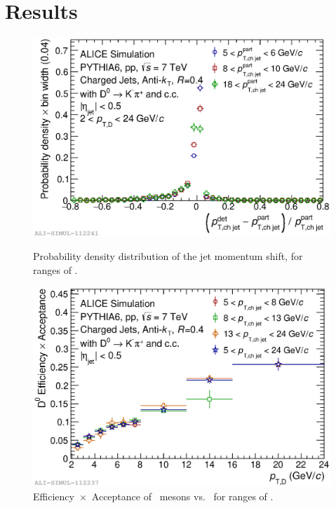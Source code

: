 \documentclass[a4paper]{jpconf}
\begin{document}
\section{Results}
\label{sect:detperf}
\begin{figure}[tb]
\centering
\begin{minipage}{.48\textwidth}
\includegraphics[width=\textwidth]{img/HQ16_Simulation_DetectorResponse}
\caption{\label{fig:HQ16_Simulation_DetectorResponse} Probability density distribution of the jet momentum shift, for ranges of \ptchjet.}
\end{minipage}\hspace{1pc}%
\begin{minipage}{.48\textwidth}
\includegraphics[width=\textwidth]{img/HQ16_Simulation_EfficiencyVsDPt}
\caption{\label{fig:HQ16_Simulation_EfficiencyVsDPt}Efficiency~$\times$~Acceptance of \Dzero\ mesons vs. \ptd\ for ranges of \ptchjet.}
\end{minipage} 
\end{figure}
\end{document}
